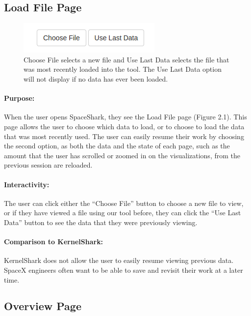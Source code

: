 \documentclass{hmcclinic}
\begin{document}
\subsection{Load File Page}

\begin{figure}[H]
  \centering
      \includegraphics[scale=0.75]{loadFile-buttons.png}
  \caption{Choose File selects a new file and Use Last Data selects the file
  that was most recently loaded into the tool. The Use Last Data option will not
display if no data has ever been loaded.}
  \end{figure}

\paragraph{Purpose:}
When the user opens SpaceShark, they see the Load File page (Figure 2.1).  This
page allows the user to choose which data to load, or to choose to load the data
that was most recently used.  The user can easily resume their work by choosing
the second option, as both the data and the state of each page, such as the amount that the user has scrolled or zoomed in on the visualizations, from the
previous session are reloaded.

\paragraph{Interactivity:}
The user can click either the ``Choose File'' button to choose a new file to view, or if they have viewed a file using our tool before, they can click the ``Use Last Data'' button to see the data that they were previously viewing.

\paragraph{Comparison to KernelShark:}
KernelShark does not allow the user to easily resume viewing previous data. SpaceX engineers often want to be able to save and revisit their work at a later time. 


  \subsection{Overview Page} 
  
\end{document}

